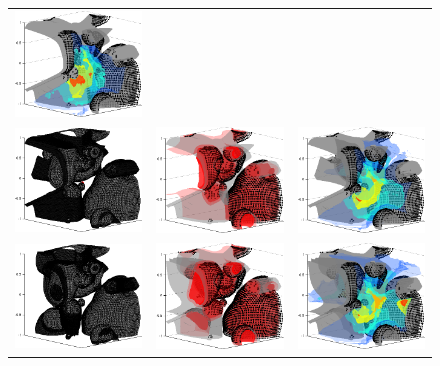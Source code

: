 \begin{figure}
\begin{tabular}{ccc}
\includegraphics[width=1.5in]{energy_02}\\
\includegraphics[width=1.5in]{view_03}&
\includegraphics[width=1.5in]{marginal_03}&
\includegraphics[width=1.5in]{energy_03}\\
\includegraphics[width=1.5in]{view_04}&
\includegraphics[width=1.5in]{marginal_04}&
\includegraphics[width=1.5in]{energy_04}\\

\end{tabular}
\end{figure}
